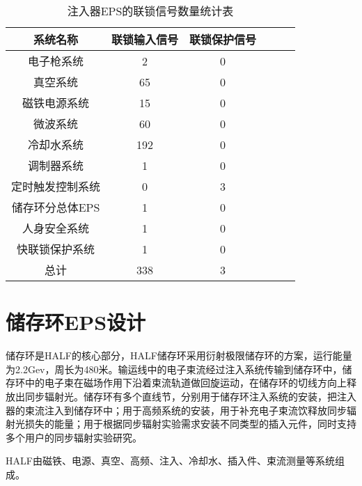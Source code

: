 \begin{table}[!hbt]
  \centering
  \caption{注入器EPS的联锁信号数量统计表}
  \label{table:4.3} 
  \begin{center}
  \begin{tabular}{cccccc}
    \toprule

     系统名称&联锁输入信号&联锁保护信号\\
    \midrule
    电子枪系统& 2& 0 \\
    
    真空系统  & 65 & 0 \\
    
    磁铁电源系统 &15 & 0\\
    
    微波系统 &60  &0 \\
    
    冷却水系统  &192& 0\\

    调制器系统& 1& 0\\
    
    定时触发控制系统 &0 & 3\\

    储存环分总体EPS & 1& 0\\
    
    人身安全系统& 1& 0\\

    快联锁保护系统&1& 0\\

    总计&338& 3\\

    \bottomrule
  \end{tabular}
\end{center}
\end{table}

\section{储存环EPS设计}

储存环是HALF的核心部分，HALF储存环采用衍射极限储存环的方案，运行能量为2.2Gev，周长为480米。输运线中的电子束流经过注入系统传输到储存环中，储存环中的电子束在磁场作用下沿着束流轨道做回旋运动，在储存环的切线方向上释放出同步辐射光。储存环有多个直线节，分别用于储存环注入系统的安装，把注入器的束流注入到储存环中；用于高频系统的安装，用于补充电子束流饮释放同步辐射光损失的能量；用于根据同步辐射实验需求安装不同类型的插入元件，同时支持多个用户的同步辐射实验研究。

HALF由磁铁、电源、真空、高频、注入、冷却水、插入件、束流测量等系统组成。

